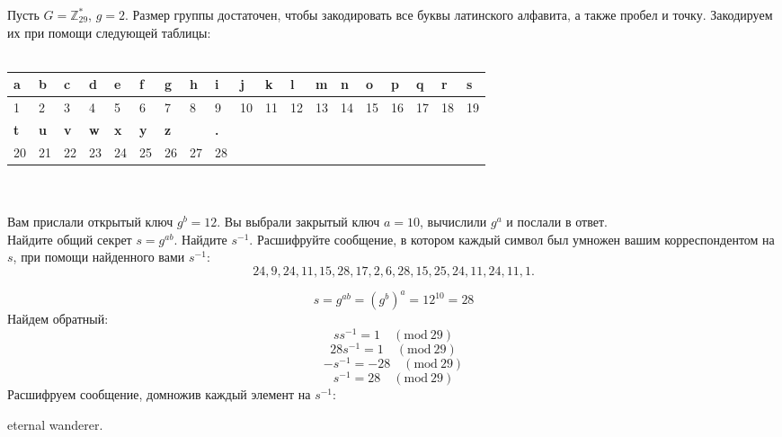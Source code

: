 \begin{problem}
    Пусть \(G = \mathbb{Z}_{29}^*\), \(g = 2\). Размер группы достаточен, чтобы закодировать все буквы латинского алфавита, а также пробел и точку. Закодируем их при помощи следующей таблицы:
    \\\\
    \begin{tabular}{|l|l|l|l|l|l|l|l|l|l|l|l|l|l|l|l|l|l|l|}
        \hline
        \textbf{a} & \textbf{b} & \textbf{c} & \textbf{d} & \textbf{e} & \textbf{f} & \textbf{g} & \textbf{h} & \textbf{i} & \textbf{j}
        & \textbf{k} & \textbf{l} & \textbf{m} & \textbf{n} & \textbf{o} & \textbf{p} & \textbf{q} & \textbf{r} & \textbf{s} \\
        \hline
        1 & 2 & 3 & 4 & 5 & 6 & 7 & 8 & 9 & 10 & 11 & 12 & 13 & 14 & 15 & 16 & 17 & 18 & 19 \\
        \hline
        \textbf{t} & \textbf{u} & \textbf{v} & \textbf{w} & \textbf{x} & \textbf{y} & \textbf{z} & & \textbf{.} &&&&&&&&&& \\
        \hline
        20 & 21 & 22 & 23 & 24 & 25 & 26 & 27 & 28 &&&&&&&&&& \\
        \hline
    \end{tabular}
    \\\\
    Вам прислали открытый ключ $g^b = 12$. Вы выбрали закрытый ключ $a = 10$, вычислили $g^a$ и послали в ответ. \\
    Найдите общий секрет $s = g^{ab}$. Найдите $s^{-1}$. Расшифруйте сообщение, в котором каждый символ был умножен вашим корреспондентом на $s$, при помощи найденного вами $s^{-1}$:
\[24, 9, 24, 11, 15, 28, 17, 2, 6, 28, 15, 25, 24, 11, 24, 11, 1.\]

\end{problem}
\begin{solution}
    \[
    s = g^{ab} = (g^b)^a = 12^{10} = 28
    \]
    Найдем обратный:
    \[
    ss^{-1} = 1 \quad (\text{mod} \ 29)\]
    \[
    28 s^{-1} = 1 \quad (\text{mod} \ 29) \]
    \[
    - s^{-1} = -28 \quad (\text{mod} \ 29)
    \]
    \[
    s^{-1} = 28 \quad (\text{mod} \ 29)
    \]
    Расшифруем сообщение, домножив каждый элемент на $s^{-1}$:
    \begin{center}
        eternal wanderer.
    \end{center}
\end{solution}